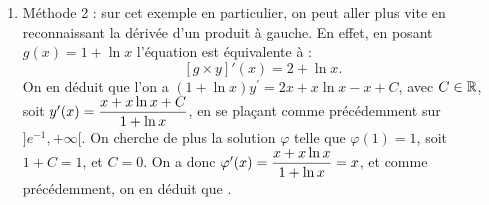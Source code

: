 \documentclass[a4paper, 11pt,reqno]{article}
\begin{document}
\begin{correction}
\begin{enumerate}
\begin{itemize}
$$\begin{array}{cl}
\Leftrightarrow & C'(x) = 2 + \ln x
\end{array}$$
On peut donc prendre $C(x) = 2x + x\ln x -x = x+x\ln x$ (pour retrouver une primitive de $\ln x$, utiliser une int\'egration par parties), soit $z_p(x) =\ddp \frac{ x+x\ln x}{1+\ln x} = x$.
\item[$\star$] On en d\'eduit que la solution g\'en\'erale est donn\'ee par , avec $C \in \R$.
\end{itemize}
On a donc $y'(x) =  \ddp \frac{C}{1+\ln x} + x$, avec $C \in \R$. Or on cherche la solution $\varphi$ v\'erifiant $\varphi'(1) = 1$. On doit donc avoir $ C + 1 =1$, soit $C=0$. Donc on a $\varphi'(x) =x$, soit $\varphi(x) = \ddp \frac{x^2}{2} + K$, avec $K \in \R$. Or on sait que $\varphi(1)=\ddp \frac{1}{2}$, donc on doit avoir  $\ddp \frac{1}{2} + K = \ddp \frac{1}{2}$, et donc $K=0$. Finalement, on obtient .
\item M\'ethode 2 : sur cet exemple en particulier, on peut aller plus vite en reconnaissant la d\'eriv\'ee d'un produit \`a gauche. En effet, en posant $g(x) = 1+\ln x$ l'\'equation est \'equivalente \`a :
$$\left[g \times y\right]'(x) =2+\ln{x}.$$
On en d\'eduit que l'on a $(1+\ln{x})y^{\prime} = 2x + x \ln x - x + C$, avec $C\in \R$, soit $y'(x) = \displaystyle \frac{x+x\ln x + C}{1+\ln x}$, en se pla\c cant comme pr\'ec\'edemment sur $]e^{-1}, +\infty[$. On cherche de plus la solution $\varphi$ telle que $\varphi(1) = 1$, soit $1+C=1$, et $C=0$. On a donc $\varphi'(x)= \displaystyle \frac{x+x\ln x }{1+\ln x} = x$, et comme pr\'ec\'edemment, on en d\'eduit que .
\end{enumerate}
\end{correction}






\end{document}
